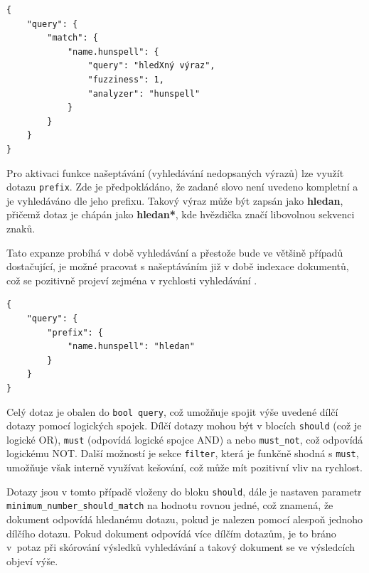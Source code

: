\documentclass[FM,DP]{tulthesis}
\newenvironment{code}
    {\filbreak\captionsetup{type=listing}}{\filbreak}
\begin{document}
\begin{code}
\captionsetup{singlelinecheck=false,justification=raggedright}
\label{code:es-search-2}
\begin{verbatim}
{
    "query": {
        "match": {
            "name.hunspell": {
                "query": "hledXný výraz",
                "fuzziness": 1,
                "analyzer": "hunspell"
            }
        }
    }
}
\end{verbatim}
\end{code}

Pro aktivaci funkce našeptávání (vyhledávání nedopsaných výrazů) lze využít dotazu \verb|prefix|.
Zde je předpokládáno, že zadané slovo není uvedeno kompletní a je vyhledáváno
dle jeho prefixu. Takový výraz může být zapsán jako \textbf{hledan}, přičemž dotaz je chápán
jako \textbf{hledan*}, kde hvězdička značí libovolnou sekvenci znaků.

Tato expanze probíhá v době vyhledávání a přestože bude ve většině případů dostačující, 
je možné pracovat s našeptáváním již v době indexace dokumentů, což se pozitivně projeví zejména 
v rychlosti vyhledávání \cite{es-suggester}.

\begin{code}
\captionsetup{singlelinecheck=false,justification=raggedright}
\label{code:es-search-3}
\begin{verbatim}
{
    "query": {
        "prefix": {
            "name.hunspell": "hledan"
        }
    }
}
\end{verbatim}
\end{code}

Celý dotaz je obalen do \verb|bool query|, což umožňuje spojit výše uvedené dílčí dotazy pomocí
logických spojek. Dílčí dotazy mohou být v blocích \verb|should| (což je logické OR), 
\verb|must| (odpovídá logické spojce AND) a nebo \verb|must_not|, což odpovídá logickému NOT.
Další možností je sekce \verb|filter|, která je funkčně shodná s \verb|must|, umožňuje však
interně využívat kešování, což může mít pozitivní vliv na rychlost.

Dotazy jsou v tomto případě vloženy do bloku \verb|should|, dále je nastaven parametr
\verb|minimum_number_should_match| na hodnotu rovnou jedné, což znamená, že dokument odpovídá
hledanému dotazu, pokud je nalezen pomocí alespoň jednoho dílčího dotazu.
Pokud dokument odpovídá více dílčím dotazům, je to bráno v~potaz při skórování
výsledků vyhledávání a takový dokument se ve výsledcích objeví výše.
\end{document}
